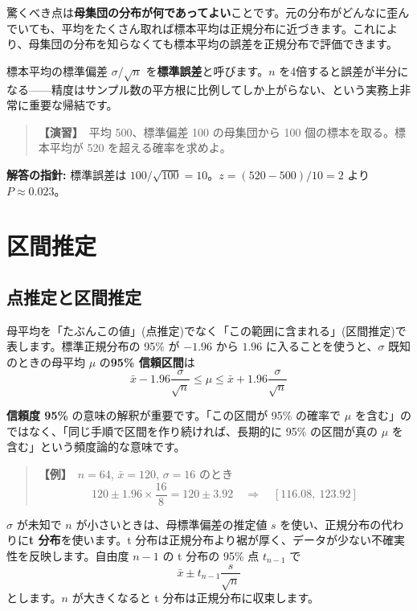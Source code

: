\documentclass{article}
\begin{document}
驚くべき点は\textbf{母集団の分布が何であってよい}ことです。元の分布がどんなに歪んでいても、平均をたくさん取れば標本平均は正規分布に近づきます。これにより、母集団の分布を知らなくても標本平均の誤差を正規分布で評価できます。

標本平均の標準偏差 \(\sigma/\sqrt{n}\) を\textbf{標準誤差}と呼びます。\(n\) を4倍すると誤差が半分になる——精度はサンプル数の平方根に比例してしか上がらない、という実務上非常に重要な帰結です。

\begin{quote}
\textbf{【演習】}\ 平均 500、標準偏差 100 の母集団から 100 個の標本を取る。標本平均が 520 を超える確率を求めよ。
\end{quote}

\textbf{解答の指針:} 標準誤差は \(100/\sqrt{100} = 10\)。\(z = (520 - 500)/10 = 2\) より \(P \approx 0.023\)。

\section{区間推定}

\subsection{点推定と区間推定}

母平均を「たぶんこの値」(点推定)でなく「この範囲に含まれる」(区間推定)で表します。標準正規分布の 95\% が \(-1.96\) から \(1.96\) に入ることを使うと、\(\sigma\) 既知のときの母平均 \(\mu\) の\textbf{95\% 信頼区間}は
\[ \bar{x} - 1.96 \frac{\sigma}{\sqrt{n}} \le \mu \le \bar{x} + 1.96 \frac{\sigma}{\sqrt{n}} \]

\textbf{信頼度 95\%} の意味の解釈が重要です。「この区間が 95\% の確率で \(\mu\) を含む」のではなく、「同じ手順で区間を作り続ければ、長期的に 95\% の区間が真の \(\mu\) を含む」という頻度論的な意味です。

\begin{quote}
\textbf{【例】}\ \(n = 64\), \(\bar{x} = 120\), \(\sigma = 16\) のとき
\[ 120 \pm 1.96 \times \frac{16}{8} = 120 \pm 3.92 \quad \Rightarrow \quad [116.08,\ 123.92] \]
\end{quote}

\(\sigma\) が未知で \(n\) が小さいときは、母標準偏差の推定値 \(s\) を使い、正規分布の代わりに\textbf{t 分布}を使います。t 分布は正規分布より裾が厚く、データが少ない不確実性を反映します。自由度 \(n-1\) の t 分布の 95\% 点 \(t_{n-1}\) で
\[ \bar{x} \pm t_{n-1} \frac{s}{\sqrt{n}} \]
とします。\(n\) が大きくなると t 分布は正規分布に収束します。
\end{document}
